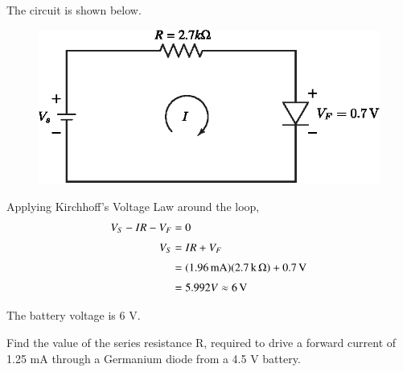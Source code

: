 \begin{solution}
The circuit is shown below.
\begin{figure}[H]
\centering
\includegraphics{chap1/S3-EE-01-023.eps}
\end{figure}

Applying Kirchhoff's Voltage Law around the loop,
\begin{align*}
V_S - IR - V_F & = 0\\[3pt]
V_S & = IR + V_F \\[3pt]
& = (1.96 \operatorname{mA}) (2.7 \operatorname{k} \Omega) + 0.7 \operatorname{\mathrm{V}}\\[3pt]
& = 5.992 V \approx 6 \operatorname{\mathrm{V}}
\end{align*}

The battery voltage is 6 V.
\end{solution}

\smallskip

\begin{example}\label{exam1.12}
Find the value of the series resistance R, required to drive a
forward current of 1.25 mA through a Germanium diode from a 4.5 V battery.
\end{example}


